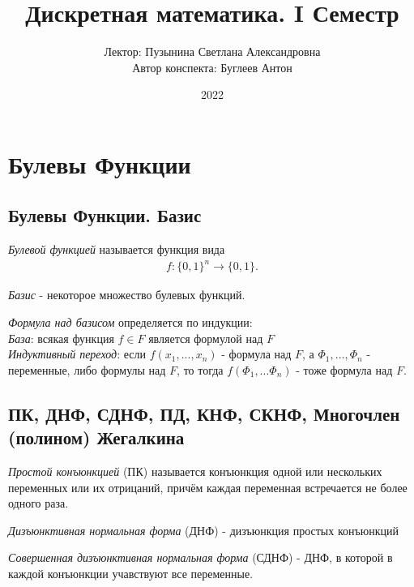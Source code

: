 \documentclass[a4paper, 14pt]{article}
\title{Дискретная математика. I Семестр}
\author{Лектор: Пузынина Светлана Александровна \\
        Автор конспекта: Буглеев Антон}
\date{2022}
\begin{document}
    
    \maketitle
    \newpage

    \section{Булевы Функции}
    
    \subsection*{Булевы Функции. Базис}
    \begin{definition}
        {\it Булевой функцией} называется функция вида
        \begin{align*}
            f : \{0, 1\}^n \rightarrow \{0, 1\}.
        \end{align*}
    \end{definition}

    \begin{definition}
        {\it Базис} - некоторое множество булевых функций.
    \end{definition}
    
    \begin{definition}
        {\it Формула над базисом} определяется по индукции: \\
        {\it База}: всякая функция $f \in F$ является формулой над $F$ \\
        {\it Индуктивный переход}: если $f(x_1, ..., x_n)$ - формула над $F$,
        а $\Phi_1, ..., \Phi_n$ - переменные, либо формулы над $F$, то тогда
        $f(\Phi_1, ... \Phi_n)$ - тоже формула над $F$.
    \end{definition}


    \subsection*{ПК, ДНФ, СДНФ, ПД, КНФ, СКНФ, Многочлен (полином) Жегалкина}
    \begin{definition}
        {\it Простой конъюнкцией} (ПК) называется конъюнкция одной или нескольких переменных
        или их отрицаний, причём каждая переменная встречается не более одного раза.
    \end{definition}
    \begin{definition}
        {\it Дизъюнктивная нормальная форма} (ДНФ) - дизъюнкция простых конъюнкций
    \end{definition}
    \begin{definition}
        {\it Совершенная дизъюнктивная нормальная форма} (СДНФ) - ДНФ, в которой в
        каждой конъюнкции учавствуют все переменные. 
    \end{definition}
\end{document}
